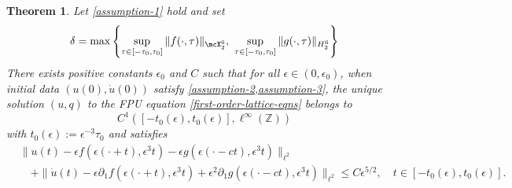 \documentclass[oneside,reqno]{amsart}
\newtheorem{theorem}{Theorem}[section]
\begin{document}
\begin{theorem}\label{thm:long-time-stability}
	Let \cref{assumption-1} hold and set
	\begin{equation*}
		\delta = \max \left\{\sup_{\tau\in[-\tau_0, \tau_0]}\|f(\cdot,\tau)\|_{\mcX^6_2},\ \sup_{\tau\in[-\tau_0, \tau_0]} \|g(\cdot, \tau)\|_{H^6_2} \right\}
	\end{equation*}
	There exists positive constants \(\epsilon_0\) and \(C\) such that for all \(\epsilon \in(0,\epsilon_0)\), when initial data \((u(0), \dot u(0))\) satisfy \cref{assumption-2,assumption-3}, the unique solution \((u,q)\) to the FPU equation \cref{first-order-lattice-eqns} belongs to 
	\begin{equation*}
		C^1([-t_0(\epsilon), t_0(\epsilon)], \ell^\infty(\mathbb Z))
	\end{equation*}
	with \(t_0(\epsilon):= \epsilon^{-3}\tau_0 \) and satisfies
	\begin{equation*}
		\begin{aligned}
			&\| u(t) - \epsilon f(\epsilon(\cdot+t), \epsilon^3 t) -\epsilon g(\epsilon(\cdot -ct) ,\epsilon^3 t) \|_{\ell^2} \\
			&\quad + \| \dot u(t) - \epsilon \partial_1 f(\epsilon (\cdot +t),\epsilon^3t)  +\epsilon^2 \partial_1 g(\epsilon(\cdot - ct), \epsilon^3t)\|_{\ell^2} \leq C \epsilon^{5/2 }, \quad t\in[-t_0(\epsilon), t_0(\epsilon)].
		\end{aligned}
	\end{equation*}
\end{theorem}
\end{document}
